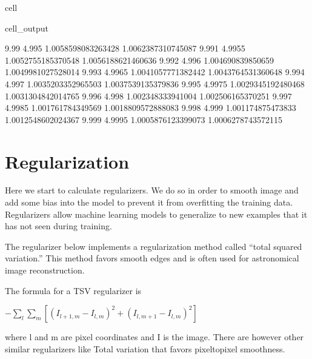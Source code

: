 \documentclass[letterpaper,10pt,english]{jupyterBook}
\begin{document}
\begin{sphinxuseclass}{cell}
\begin{sphinxVerbatimOutput}
\begin{sphinxuseclass}{cell_output}
\begin{sphinxVerbatim}[commandchars=\\\{\}]
9.99 4.995 \PYGZhy{}1.0058598083263428 \PYGZhy{}1.0062387310745087
9.991 4.9955 \PYGZhy{}1.0052755185370548 \PYGZhy{}1.0056188621460636
9.992 4.996 \PYGZhy{}1.004690839850659 \PYGZhy{}1.0049981027528014
9.993 4.9965 \PYGZhy{}1.0041057771382442 \PYGZhy{}1.0043764531360648
9.994 4.997 \PYGZhy{}1.0035203352965503 \PYGZhy{}1.0037539135379836
9.995 4.9975 \PYGZhy{}1.0029345192480468 \PYGZhy{}1.0031304842014765
9.996 4.998 \PYGZhy{}1.002348333941004 \PYGZhy{}1.002506165370251
9.997 4.9985 \PYGZhy{}1.001761784349569 \PYGZhy{}1.0018809572888083
9.998 4.999 \PYGZhy{}1.001174875473833 \PYGZhy{}1.0012548602024367
9.999 4.9995 \PYGZhy{}1.0005876123399073 \PYGZhy{}1.0006278743572115
\end{sphinxVerbatim}

\end{sphinxuseclass}\end{sphinxVerbatimOutput}

\end{sphinxuseclass}

\section{Regularization}
\label{\detokenize{interpolation:regularization}}
\sphinxAtStartPar
Here we start to calculate regularizers. We do so in order to smooth image and add some bias into the model to prevent it from overfitting the training data. Regularizers allow machine learning models to generalize to new examples that it has not seen during training.

\sphinxAtStartPar
The regularizer below implements a regularization method called “total squared variation.” This method favors smooth edges and is often used for astronomical image reconstruction.

\sphinxAtStartPar
The formula for a TSV regularizer is

\sphinxAtStartPar
\(-\sum_l \sum_m[(I_{l+1,m}-I_{l,m})^2+(I_{l,m+1}-I_{l,m})^2]\)

\sphinxAtStartPar
where l and m are pixel coordinates and I is the image. There are however other similar regularizers like Total variation that favors pixel\sphinxhyphen{}to\sphinxhyphen{}pixel smoothness.
\end{document}
